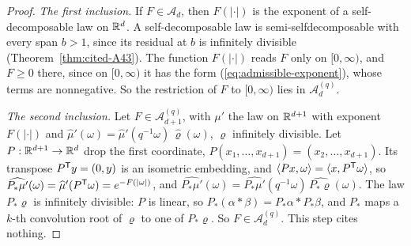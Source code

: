 \begin{proof}
\leanok
{}
\emph{The first inclusion.} If $F \in \mathcal{A}_d$, then $F(|\cdot|)$ is the exponent of a
self-decomposable law on $\mathbb{R}^d$. A self-decomposable law is semi-selfdecomposable with every span
$b > 1$, since its residual at $b$ is infinitely divisible (Theorem~\ref{thm:cited-A43}). The
function $F(|\cdot|)$ reads $F$ only on $[0,\infty)$, and $F \ge 0$ there, since on
$[0,\infty)$ it has the form (\ref{eq:admissible-exponent}), whose terms are nonnegative. So the
restriction of $F$ to $[0,\infty)$ lies in $\mathcal{A}^{(q)}_d$.

\emph{The second inclusion.} Let $F \in \mathcal{A}^{(q)}_{d+1}$, with $\mu'$ the law on $\mathbb{R}^{d+1}$
with exponent $F(|\cdot|)$ and $\widehat\mu'(\omega) = \widehat\mu'(q^{-1}\omega)\,\widehat\varrho(\omega)$,
$\varrho$ infinitely divisible. Let $P : \mathbb{R}^{d+1} \to \mathbb{R}^d$ drop the first coordinate,
$P(x_1, \dots, x_{d+1}) = (x_2, \dots, x_{d+1})$. Its transpose $P^{\mathsf{T}}y = (0, y)$ is an isometric
embedding, and $\langle Px, \omega\rangle = \langle x, P^{\mathsf{T}}\omega\rangle$, so
$\widehat{P_*\mu'}(\omega) = \widehat\mu'(P^{\mathsf{T}}\omega) = e^{-F(|\omega|)}$, and
$\widehat{P_*\mu'}(\omega) = \widehat{P_*\mu'}(q^{-1}\omega)\,\widehat{P_*\varrho}(\omega)$. The law
$P_*\varrho$ is infinitely divisible: $P$ is linear, so $P_*(\alpha * \beta) = P_*\alpha * P_*\beta$,
and $P_*$ maps a $k$-th convolution root of $\varrho$ to one of $P_*\varrho$. So
$F \in \mathcal{A}^{(q)}_d$. This step cites nothing.


\end{proof}

